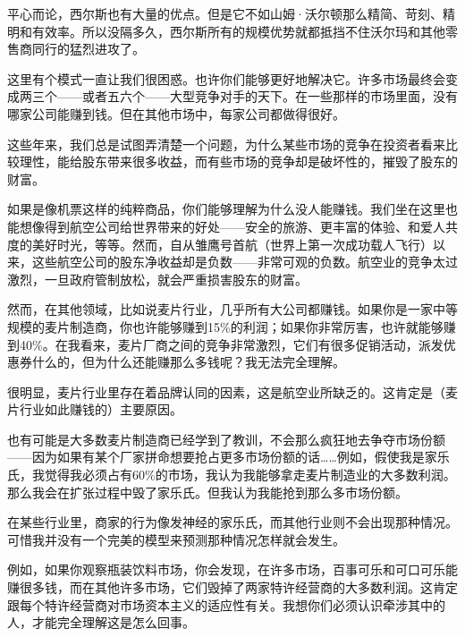 平心而论，西尔斯也有大量的优点。但是它不如山姆·沃尔顿那么精简、苛刻、精明和有效率。所以没隔多久，西尔斯所有的规模优势就都抵挡不住沃尔玛和其他零售商同行的猛烈进攻了。
\par

这里有个模式一直让我们很困惑。也许你们能够更好地解决它。许多市场最终会变成两三个——或者五六个——大型竞争对手的天下。在一些那样的市场里面，没有哪家公司能赚到钱。但在其他市场中，每家公司都做得很好。
\par

这些年来，我们总是试图弄清楚一个问题，为什么某些市场的竞争在投资者看来比较理性，能给股东带来很多收益，而有些市场的竞争却是破坏性的，摧毁了股东的财富。
\par

如果是像机票这样的纯粹商品，你们能够理解为什么没人能赚钱。我们坐在这里也能想像得到航空公司给世界带来的好处——安全的旅游、更丰富的体验、和爱人共度的美好时光，等等。然而，自从雏鹰号首航（世界上第一次成功载人飞行）以来，这些航空公司的股东净收益却是负数——非常可观的负数。航空业的竞争太过激烈，一旦政府管制放松，就会严重损害股东的财富。
\par

然而，在其他领域，比如说麦片行业，几乎所有大公司都赚钱。如果你是一家中等规模的麦片制造商，你也许能够赚到15\%的利润；如果你非常厉害，也许就能够赚到40\%。在我看来，麦片厂商之间的竞争非常激烈，它们有很多促销活动，派发优惠券什么的，但为什么还能赚那么多钱呢？我无法完全理解。
\par

很明显，麦片行业里存在着品牌认同的因素，这是航空业所缺乏的。这肯定是（麦片行业如此赚钱的）主要原因。
\par

也有可能是大多数麦片制造商已经学到了教训，不会那么疯狂地去争夺市场份额——因为如果有某个厂家拼命想要抢占更多市场份额的话……例如，假使我是家乐氏，我觉得我必须占有60\%的市场，我认为我能够拿走麦片制造业的大多数利润。那么我会在扩张过程中毁了家乐氏。但我认为我能抢到那么多市场份额。
\par

在某些行业里，商家的行为像发神经的家乐氏，而其他行业则不会出现那种情况。可惜我并没有一个完美的模型来预测那种情况怎样就会发生。
\par

例如，如果你观察瓶装饮料市场，你会发现，在许多市场，百事可乐和可口可乐能赚很多钱，而在其他许多市场，它们毁掉了两家特许经营商的大多数利润。这肯定跟每个特许经营商对市场资本主义的适应性有关。我想你们必须认识牵涉其中的人，才能完全理解这是怎么回事。
\par


